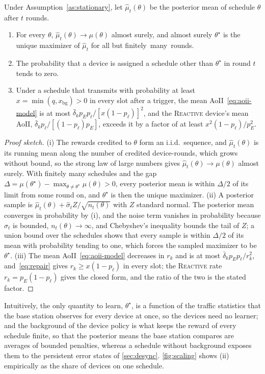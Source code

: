 \documentclass[conference]{IEEEtran}
\begin{document}
  \begin{theorem}
  \label{thm:consistency}
  Under Assumption~\ref{as:stationary}, let $\hat\mu_t(\theta)$ be the posterior mean of schedule $\theta$ after $t$ rounds.
  \begin{enumerate}
    \item[(i)] For every $\theta$, $\hat\mu_t(\theta) \to \mu(\theta)$ almost surely, and almost surely $\theta^\star$ is the unique maximizer of $\hat\mu_t$ for all but finitely~many~rounds.
    \item[(ii)] The probability that a device is assigned a schedule other than $\theta^\star$ in round $t$ tends to zero.
    \item[(iii)] Under a schedule that transmits with probability at least $x = \min(q, x_{\mathrm{bg}}) > 0$ in every slot after a trigger, the mean AoII~\eqref{eq:aoii-model} is at most $\bar\delta_k p_E p_\ell / [x(1 - p_\ell)]^2$, and the \textup{\textsc{Reactive}} device's mean AoII, $\bar\delta_k p_\ell / [(1 - p_\ell) p_E]$, exceeds it by a factor of at least $x^2 (1 - p_\ell) / p_E^2$.
  \end{enumerate}
  \end{theorem}

  \begin{proof}[Proof sketch]
  (i) The rewards credited to $\theta$ form an i.i.d.\ sequence, and $\hat\mu_t(\theta)$ is its running mean along the number of credited device-rounds, which grows without bound, so the strong law of large numbers gives $\hat\mu_t(\theta) \to \mu(\theta)$ almost surely.
  With finitely many schedules and the gap $\Delta = \mu(\theta^\star) - \max_{\theta \neq \theta^\star} \mu(\theta) > 0$, every posterior mean is within $\Delta/2$ of its limit from some round on, and $\theta^\star$ is then the unique maximizer.
  (ii) A posterior sample is $\hat\mu_t(\theta) + \hat\sigma_t Z / \sqrt{n_t(\theta)}$ with $Z$ standard normal.
  The posterior mean converges in probability by (i), and the noise term vanishes in probability because $\hat\sigma_t$ is bounded, $n_t(\theta) \to \infty$, and Chebyshev's inequality bounds the tail of $Z$; a union bound over the schedules shows that every sample is within $\Delta/2$ of its mean with probability tending to one, which forces the sampled maximizer to be $\theta^\star$.
  (iii) The mean AoII~\eqref{eq:aoii-model} decreases in $r_k$ and is at most $\bar\delta_k p_E p_\ell / r_k^2$, and~\eqref{eq:repair} gives $r_k \ge x (1 - p_\ell)$ in every slot; the \textsc{Reactive} rate $r_k = p_E (1 - p_\ell)$ gives the closed form, and the ratio of the two is the stated factor.
  \end{proof}
  Intuitively, the only quantity to learn, $\theta^\star$, is a function of the traffic statistics that the base station observes for every device at once, so the devices need no learner; and the background of the device policy is what keeps the reward of every schedule finite, so that the posterior means the base station compares are averages of bounded penalties, whereas a schedule without background exposes them to the persistent error states of \autoref{sec:desync}.
  \autoref{fig:scaling} shows (ii) empirically as the share of devices on one schedule.
\end{document}
